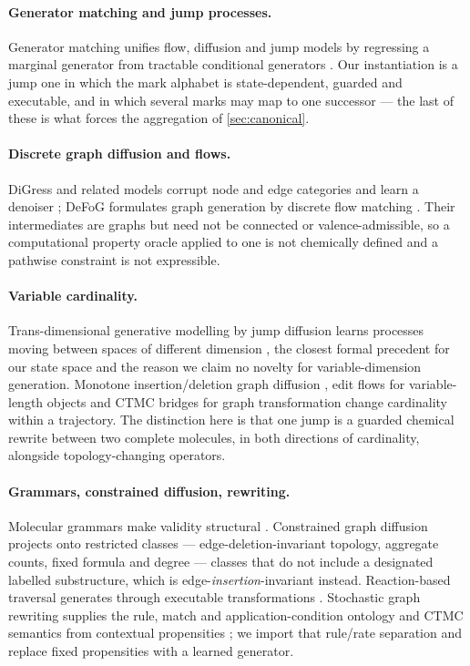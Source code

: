 \paragraph{Generator matching and jump processes.}
Generator matching unifies flow, diffusion and jump models by regressing a marginal generator from tractable conditional generators \citep{holderrieth2025generator}. Our instantiation is a jump one in which the mark alphabet is state-dependent, guarded and executable, and in which several marks may map to one successor --- the last of these is what forces the aggregation of \cref{sec:canonical}.

\paragraph{Discrete graph diffusion and flows.}
DiGress and related models corrupt node and edge categories and learn a denoiser \citep{vignac2023digress,austin2021d3pm,campbell2022ctdd}; DeFoG formulates graph generation by discrete flow matching \citep{qin2025defog}. Their intermediates are graphs but need not be connected or valence-admissible, so a computational property oracle applied to one is not chemically defined and a pathwise constraint is not expressible.

\paragraph{Variable cardinality.}
Trans-dimensional generative modelling by jump diffusion learns processes moving between spaces of different dimension \citep{campbell2023jump}, the closest formal precedent for our state space and the reason we claim no novelty for variable-dimension generation. Monotone insertion/deletion graph diffusion \citep{ninniri2025griddd}, edit flows for variable-length objects \citep{havasi2025editflows} and CTMC bridges for graph transformation \citep{kim2025ddsbm} change cardinality within a trajectory. The distinction here is that one jump is a guarded chemical rewrite between two complete molecules, in both directions of cardinality, alongside topology-changing operators.

\paragraph{Grammars, constrained diffusion, rewriting.}
Molecular grammars make validity structural \citep{kajino2019mhg,guo2022grammar}. Constrained graph diffusion projects onto restricted classes --- edge-deletion-invariant topology, aggregate counts, fixed formula and degree \citep{madeira2024construct,sharma2024prodigy,ruizbotella2026cocograph} --- classes that do not include a designated labelled substructure, which is edge-\emph{insertion}-invariant instead. Reaction-based traversal generates through executable transformations \citep{koziarski2024rgfn}. Stochastic graph rewriting supplies the rule, match and application-condition ontology and CTMC semantics from contextual propensities \citep{danos2015thermodynamic,behr2021rewriting}; we import that rule/rate separation and replace fixed propensities with a learned generator.

